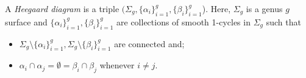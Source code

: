 

    A \emph{Heegaard diagram} is a triple $(\Sigma_g, \{\alpha_i\}_{i=1}^g, \{\beta_i\}_{i=1}^g$). Here, $\Sigma_g$ is a genus $g$ surface and $\{\alpha_i\}_{i=1}^g, \{\beta_i\}_{i=1}^g$ are collections of smooth 1-cycles in $\Sigma_g$ such that
    \begin{itemize}
         \item $\Sigma_g\setminus \{\alpha_i\}_{i=1}^g, \Sigma_g\setminus \{\beta_i\}_{i=1}^g$ are connected and;
         \item $\alpha_i\cap \alpha_j=\emptyset = \beta_i \cap \beta_j$ whenever $i\neq j$.
    \end{itemize}
